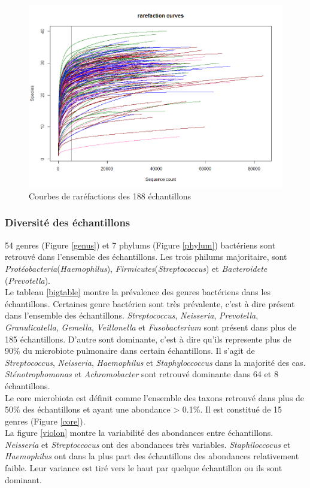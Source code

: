 \documentclass[12pt,a4paper]{article}
\begin{document}
\begin{figure}[!ht]
\begin{center}
\includegraphics[scale=0.5]{img/rarefaction.png}\hfill
\end{center}
\caption{Courbes de raréfactions des 188 échantillons}
\label{rarefaction}
\end{figure}




\subsubsection{Diversité des échantillons}

54 genres (Figure \ref{genus})  et 7 phylums (Figure \ref{phylum}) bactériens sont retrouvé dans l’ensemble des échantillons. 
Les trois philums majoritaire, sont \textit{Protéobacteria}(\textit{Haemophilus}), \textit{Firmicutes}(\textit{Streptococcus}) et \textit{Bacteroidete} (\textit{Prevotella}). \\
Le tableau \ref{bigtable} montre la prévalence des genres bactériens dans les échantillons. 
Certaines genre bactérien sont très prévalente, c’est à dire présent dans l’ensemble des échantillons. \textit{Streptococcus}, \textit{Neisseria}, \textit{Prevotella}, \textit{Granulicatella}, \textit{Gemella}, \textit{Veillonella} et \textit{Fusobacterium} sont présent dans plus de 185 échantillons.
D’autre sont dominante, c’est à dire qu’ils represente plus de 90\% du microbiote pulmonaire dans certain échantillons. Il s’agit de \textit{Streptococcus}, \textit{Neisseria}, \textit{Haemophilus} et \textit{Staphyloccoccus} dans la majorité des cas. \textit{Sténotrophomonas} et \textit{Achromobacter} sont retrouvé dominante dans 64 et 8 échantillons. \\
Le core microbiota est définit comme l’ensemble des taxons retrouvé dans plus de 50\% des échantillons et ayant une abondance > 0.1\%. Il est constitué de 15 genres (Figure \ref{core}). \\
La figure \ref{violon} montre la variabilité des abondances entre échantillons. \textit{Neisseria} et \textit{Streptoccocus} ont des abondances très variables. \textit{Staphiloccocus} et \textit{Haemophilus} ont dans la plus part des échantillons des abondances relativement faible. Leur variance est tiré vers le haut par quelque échantillon ou ils sont dominant.
\end{document}
